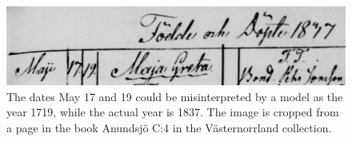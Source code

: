
\begin{figure}
    \centering
    \includegraphics[scale=0.5]{resources/33S7-9RNM-98VF_cropped.jpg}
    \caption{The dates May 17 and 19 could be misinterpreted by a model as the year 1719, while the actual year is 1837. The image is cropped from a page in the book Anundsjö C:4 in the Västernorrland collection.}
    \label{fig:example_date}
\end{figure}
